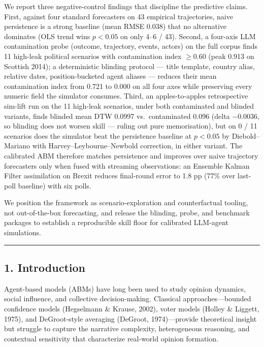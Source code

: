 \documentclass[
]{article}
\begin{document}
We report three negative-control findings that discipline the predictive
claims. First, against four standard forecasters on 43 empirical
trajectories, naive persistence is a strong baseline (mean RMSE 0.038)
that no alternative dominates (OLS trend wins \(p<0.05\) on only 4--6 /
43). Second, a four-axis LLM contamination probe (outcome, trajectory,
events, actors) on the full corpus finds 11 high-leak political
scenarios with contamination index \(\geq 0.60\) (peak 0.913 on Scottish
2014); a deterministic blinding protocol --- title template, country
alias, relative dates, position-bucketed agent aliases --- reduces their
mean contamination index from 0.721 to 0.000 on all four axes while
preserving every numeric field the simulator consumes. Third, an
apples-to-apples retrospective sim-lift run on the 11 high-leak
scenarios, under both contaminated and blinded variants, finds blinded
mean DTW 0.0997 vs.~contaminated 0.096 (delta \(-0.0036\), so blinding
does not worsen skill --- ruling out pure memorisation), but on 0 / 11
scenarios does the simulator beat the persistence baseline at \(p<0.05\)
by Diebold--Mariano with Harvey--Leybourne--Newbold correction, in
either variant. The calibrated ABM therefore matches persistence and
improves over naive trajectory forecasters only when fused with
streaming observations: an Ensemble Kalman Filter assimilation on Brexit
reduces final-round error to 1.8 pp (77\% over last-poll baseline) with
six polls.

We position the framework as scenario-exploration and counterfactual
tooling, not out-of-the-box forecasting, and release the blinding,
probe, and benchmark packages to establish a reproducible skill floor
for calibrated LLM-agent simulations.

\begin{center}\rule{0.5\linewidth}{0.5pt}\end{center}

\subsection{1. Introduction}\label{introduction}

Agent-based models (ABMs) have long been used to study opinion dynamics,
social influence, and collective decision-making. Classical
approaches---bounded confidence models (Hegselmann \& Krause, 2002),
voter models (Holley \& Liggett, 1975), and DeGroot-style averaging
(DeGroot, 1974)---provide theoretical insight but struggle to capture
the narrative complexity, heterogeneous reasoning, and contextual
sensitivity that characterize real-world opinion formation.
\end{document}
